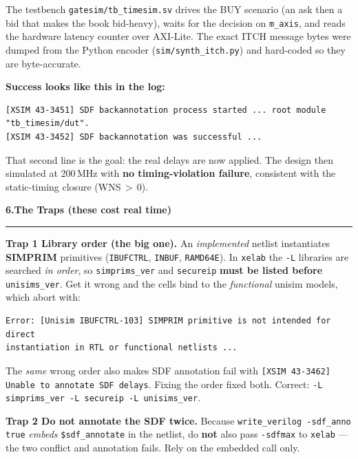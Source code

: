 \documentclass[10pt,a4paper]{article}
\newcommand{\sectionrule}{\par\nobreak\vspace{1pt}\textcolor{rulegray}{\rule{\linewidth}{0.8pt}}\par\vspace{1pt}}
\newcommand{\fpath}[1]{\texttt{\textcolor{hdrblue}{#1}}}
\begin{document}
The testbench \fpath{gatesim/tb\_timesim.sv} drives the BUY scenario (an ask then a
bid that makes the book bid-heavy), waits for the decision on \texttt{m\_axis}, and
reads the hardware latency counter over AXI-Lite. The exact ITCH message bytes were
dumped from the Python encoder (\fpath{sim/synth\_itch.py}) and hard-coded so they
are byte-accurate.

\begin{okboxx}
\textbf{Success looks like this in the log:}
\begin{lstlisting}[style=sh]
[XSIM 43-3451] SDF backannotation process started ... root module "tb_timesim/dut".
[XSIM 43-3452] SDF backannotation was successful ...
\end{lstlisting}
That second line is the goal: the real delays are now applied. The design then
simulated at 200\,MHz with \textbf{no timing-violation failure}, consistent with
the static-timing closure (WNS\,$>$\,0).
\end{okboxx}

{\large\bfseries\color{hdrblue} 6.\quad The Traps (these cost real time)}
\sectionrule

\begin{warnboxx}
\textbf{Trap 1 \textendash{} Library order (the big one).}
An \emph{implemented} netlist instantiates \textbf{SIMPRIM} primitives
(\texttt{IBUFCTRL}, \texttt{INBUF}, \texttt{RAMD64E}). In \texttt{xelab} the
\texttt{-L} libraries are searched \emph{in order}, so \texttt{simprims\_ver} and
\texttt{secureip} \textbf{must be listed before} \texttt{unisims\_ver}. Get it
wrong and the cells bind to the \emph{functional} unisim models, which abort with:
\begin{lstlisting}[style=sh]
Error: [Unisim IBUFCTRL-103] SIMPRIM primitive is not intended for direct
instantiation in RTL or functional netlists ...
\end{lstlisting}
The \emph{same} wrong order also makes SDF annotation fail with
\texttt{[XSIM 43-3462] Unable to annotate SDF delays}. Fixing the order fixed both.
Correct: \texttt{-L simprims\_ver -L secureip -L unisims\_ver}.
\end{warnboxx}

\begin{warnboxx}
\textbf{Trap 2 \textendash{} Do not annotate the SDF twice.}
Because \texttt{write\_verilog -sdf\_anno true} \emph{embeds} \texttt{\$sdf\_annotate}
in the netlist, do \textbf{not} also pass \texttt{-sdfmax} to \texttt{xelab} ---
the two conflict and annotation fails. Rely on the embedded call only.
\end{warnboxx}
\end{document}
